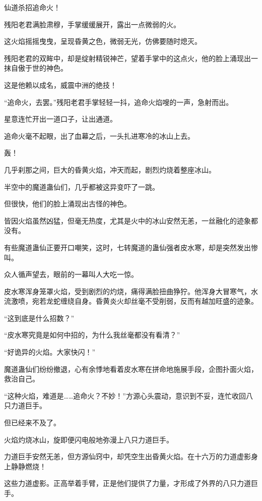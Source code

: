 
\begin{this_body}

仙道杀招追命火！

残阳老君满脸肃穆，手掌缓缓展开，露出一点微弱的火。

这火焰摇摇曳曳，呈现昏黄之色，微弱无光，仿佛要随时熄灭。

残阳老君的双眸中，却是绽射精锐神芒，望着手掌中的这点火，他的脸上涌现出一抹自傲于世的神色。

这是他赖以成名，威震中洲的绝技！

“追命火，去罢。”残阳老君手掌轻轻一抖，追命火焰嗖的一声，急射而出。

星意连忙开出一道口子，让出通道。

追命火毫不起眼，出了血幕之后，一头扎进寒冷的冰山上去。

轰！

几乎刹那之间，巨大的昏黄火焰，冲天而起，剧烈灼烧着整座冰山。

半空中的魔道蛊仙们，几乎都被这异变吓了一跳。

但很快，他们的脸上涌现出古怪的神色。

皆因火焰虽然凶猛，但毫无热度，尤其是火中的冰山安然无恙，一丝融化的迹象都没有。

有些魔道蛊仙正要开口嘲笑，这时，七转魔道的蛊仙强者皮水寒，却是突然发出惨叫。

众人循声望去，眼前的一幕叫人大吃一惊。

皮水寒浑身笼罩火焰，受到剧烈的灼烧，痛得满脸扭曲狰狞。他浑身大冒寒气，水流激喷，宛若龙蛇缠绕自身。昏黄炎火却丝毫不受削弱，反而有越加旺盛的迹象。

“这到底是什么招数？”

“皮水寒究竟是如何中招的，为什么我丝毫都没有看清？”

“好诡异的火焰。大家快闪！”

魔道蛊仙们纷纷撤退，心有余悸地看着皮水寒在拼命地施展手段，企图扑面火焰，救治自己。

“这种火焰，难道是……追命火？不妙！”方源心头震动，意识到不妥，连忙收回八只力道巨手。

但已经来不及了。

火焰灼烧冰山，旋即便闪电般地弥漫上八只力道巨手。

力道巨手安然无恙，但方源仙窍中，却凭空生出昏黄火焰。在十六万的力道虚影身上静静燃烧！

这些力道虚影。正高举着手臂，正是他们提供了力量，才形成了外界的八只力道巨手。


\end{this_body}
